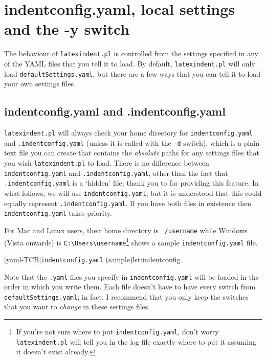 \section{indentconfig.yaml, local settings and the -y switch }\label{sec:indentconfig}
 The behaviour of \texttt{latexindent.pl} is controlled from the settings specified in
 any of the YAML files that you tell it to load. By default, \texttt{latexindent.pl} will
 only load \texttt{defaultSettings.yaml}, but there are a few ways that you can tell it
 to load your own settings files.

\subsection{indentconfig.yaml and .indentconfig.yaml}
 \texttt{latexindent.pl} will always check your home directory for
 \texttt{indentconfig.yaml}
 and \texttt{.indentconfig.yaml} (unless it is called with the \texttt{-d} switch), which
 is a plain text file you can create that contains the \emph{absolute} paths for any
 settings files that you wish \texttt{latexindent.pl} to load. There is no difference
 between \texttt{indentconfig.yaml} and \texttt{.indentconfig.yaml}, other than the fact
 that \texttt{.indentconfig.yaml} is a `hidden' file; thank you to
 \cite{jacobo-diaz-hidden-config} for providing this feature. In what follows, we will use
 \texttt{indentconfig.yaml}, but it is understood that this could equally represent
 \texttt{.indentconfig.yaml}. If you have both files in existence then
 \texttt{indentconfig.yaml} takes priority.

 For Mac and Linux users, their home directory is \texttt{~/username} while Windows
 (Vista onwards) is \lstinline!C:\Users\username!\footnote{If you're not sure where to
 put \texttt{indentconfig.yaml}, don't worry \texttt{latexindent.pl} will tell you in the
 log file exactly where to put it assuming it doesn't exist already.}
  shows a sample \texttt{indentconfig.yaml} file.

 [yaml-TCB]{\texttt{indentconfig.yaml} (sample)}{lst:indentconfig}

 Note that the \texttt{.yaml} files you specify in \texttt{indentconfig.yaml} will be
 loaded in the order in which you write them. Each file doesn't have to have every switch
 from \texttt{defaultSettings.yaml}; in fact, I recommend that you only keep the switches
 that you want to \emph{change} in these settings files.

